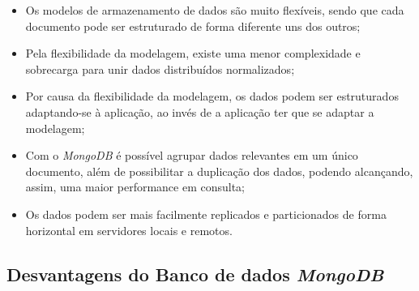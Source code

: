 \begin{itemize}
    \item Os modelos de armazenamento de dados são muito flexíveis, sendo que cada documento pode ser estruturado de forma diferente uns dos outros;
    
    \item Pela flexibilidade da modelagem, existe uma menor complexidade e sobrecarga para unir dados distribuídos normalizados;
    
    \item Por causa da flexibilidade da modelagem, os dados podem ser estruturados adaptando-se à aplicação, ao invés de a aplicação ter que se adaptar a modelagem;
    
    \item Com o \textit{MongoDB} é possível agrupar dados relevantes em um único documento, além de possibilitar a duplicação dos dados, podendo alcançando, assim, uma maior performance em consulta;
    
    
    
    
    \item Os dados podem ser mais facilmente replicados e particionados de forma horizontal em servidores locais e remotos.
\end{itemize}
    
\subsection{Desvantagens do Banco de dados \textit{MongoDB}}
    
